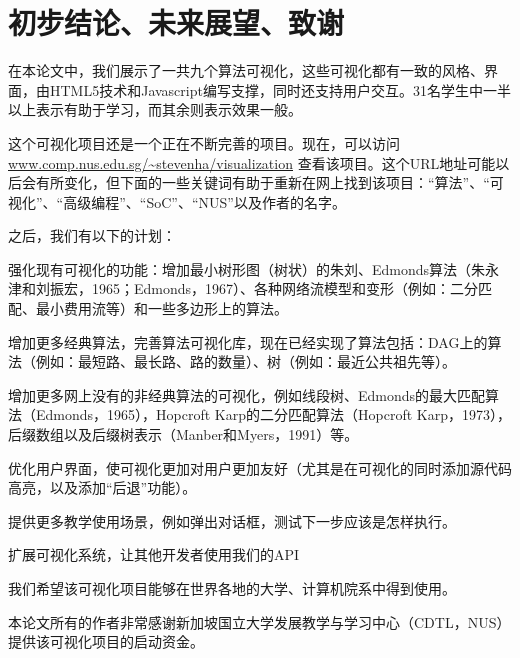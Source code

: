 \chapter{初步结论、未来展望、致谢}
\begin{sectext}
在本论文中，我们展示了一共九个算法可视化，这些可视化都有一致的风格、界面，由HTML5技术和Javascript编写支撑，同时还支持用户交互。31名学生中一半以上表示有助于学习，而其余则表示效果一般。

这个可视化项目还是一个正在不断完善的项目。现在，可以访问 \url{www.comp.nus.edu.sg/~stevenha/visualization} 查看该项目。这个URL地址可能以后会有所变化，但下面的一些关键词有助于重新在网上找到该项目：``算法''、``可视化''、``高级编程''、``SoC''、``NUS''以及作者的名字。

之后，我们有以下的计划：
\begin{itemlist}

\item 强化现有可视化的功能：增加最小树形图（树状）的朱刘、Edmonds算法（朱永津和刘振宏，1965；Edmonds，1967）、各种网络流模型和变形（例如：二分匹配、最小费用流等）和一些多边形上的算法。

\item 增加更多经典算法，完善算法可视化库，现在已经实现了算法包括：DAG上的算法（例如：最短路、最长路、路的数量）、树（例如：最近公共祖先等）。

\item 增加更多网上没有的非经典算法的可视化，例如线段树、Edmonds的最大匹配算法（Edmonds，1965），Hopcroft Karp的二分匹配算法（Hopcroft Karp，1973），后缀数组以及后缀树表示（Manber和Myers，1991）等。

\item 优化用户界面，使可视化更加对用户更加友好（尤其是在可视化的同时添加源代码高亮，以及添加``后退''功能）。

\item 提供更多教学使用场景，例如弹出对话框，测试下一步应该是怎样执行。

\item 扩展可视化系统，让其他开发者使用我们的API
\end{itemlist}

我们希望该可视化项目能够在世界各地的大学、计算机院系中得到使用。

本论文所有的作者非常感谢新加坡国立大学发展教学与学习中心（CDTL，NUS）提供该可视化项目的启动资金。
\end{sectext}
